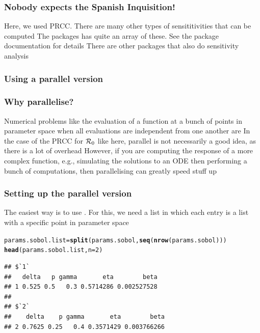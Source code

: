 \documentclass[aspectratio=169]{beamer}\usepackage[]{graphicx}\usepackage[]{xcolor}
\makeatletter
\newcommand{\hlnum}[1]{\textcolor[rgb]{0.686,0.059,0.569}{#1}}%
\newcommand{\hldef}[1]{\textcolor[rgb]{0.345,0.345,0.345}{#1}}%
\newcommand{\hlkwb}[1]{\textcolor[rgb]{0.69,0.353,0.396}{#1}}%
\newcommand{\hlkwc}[1]{\textcolor[rgb]{0.333,0.667,0.333}{#1}}%
\newcommand{\hlkwd}[1]{\textcolor[rgb]{0.737,0.353,0.396}{\textbf{#1}}}%
\newenvironment{kframe}{%
 \def\at@end@of@kframe{}%
 \ifinner\ifhmode%
  \def\at@end@of@kframe{\end{minipage}}%
  \begin{minipage}{\columnwidth}%
 \fi\fi%
 \def\FrameCommand##1{\hskip\@totalleftmargin \hskip-\fboxsep
 \colorbox{shadecolor}{##1}\hskip-\fboxsep
     \hskip-\linewidth \hskip-\@totalleftmargin \hskip\columnwidth}%
 \MakeFramed {\advance\hsize-\width
   \@totalleftmargin\z@ \linewidth\hsize
   \@setminipage}}%
 {\par\unskip\endMakeFramed%
 \at@end@of@kframe}
\newenvironment{knitrout}{}{} %
\makeatother
\begin{document}
\begin{frame}\frametitle{Nobody expects the Spanish Inquisition!}
Here, we used PRCC. There are many other types of sensititivities that can be computed
\vfill
The  packages has quite an array of these. See the package documentation for details
\vfill
There are other  packages that also do sensitivity analysis
\end{frame}

\subsubsection{Using a parallel version}

\begin{frame}\frametitle{Why parallelise?}
Numerical problems like the evaluation of a function at a bunch of points in parameter space when all evaluations are independent from one another are 
\vfill
In the case of the PRCC for $\mathcal{R}_0$ like here, parallel is not necessarily a good idea, as there is a lot of overhead
\vfill
However, if you are computing the response of a more complex function, e.g., simulating the solutions to an ODE then performing a bunch of computations, then parallelising can greatly speed stuff up
\end{frame}


\begin{frame}[fragile]\frametitle{Setting up the parallel version}
The easiest way is to use . For this, we need a list in which each entry is a list with a specific point in parameter space
\vfill
\begin{knitrout}
\color{fgcolor}\begin{kframe}
\begin{alltt}
\hldef{params.sobol.list} \hlkwb{=} \hlkwd{split}\hldef{(params.sobol,} \hlkwd{seq}\hldef{(}\hlkwd{nrow}\hldef{(params.sobol)))}
\hlkwd{head}\hldef{(params.sobol.list,} \hlkwc{n} \hldef{=} \hlnum{2}\hldef{)}
\end{alltt}
\begin{verbatim}
## $`1`
##   delta   p gamma       eta        beta
## 1 0.525 0.5   0.3 0.5714286 0.002527528
## 
## $`2`
##    delta    p gamma       eta        beta
## 2 0.7625 0.25   0.4 0.3571429 0.003766266
\end{verbatim}
\end{kframe}
\end{knitrout}
\end{frame}
\end{document}
